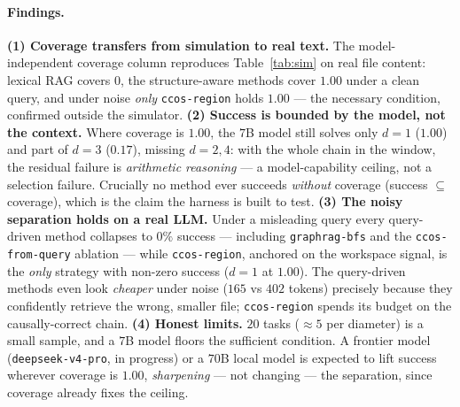 \documentclass[11pt]{article}
\newcommand{\code}[1]{\texttt{#1}}
\begin{document}
\paragraph{Findings.}
\textbf{(1) Coverage transfers from simulation to real text.} The
model-independent coverage column reproduces Table~\ref{tab:sim} on real file
content: lexical RAG covers $0$, the structure-aware methods cover $1.00$ under a
clean query, and under noise \emph{only} \code{ccos-region} holds $1.00$ --- the
necessary condition, confirmed outside the simulator.
\textbf{(2) Success is bounded by the model, not the context.} Where coverage is
$1.00$, the $7$B model still solves only $d{=}1$ ($1.00$) and part of $d{=}3$
($0.17$), missing $d{=}2,4$: with the whole chain in the window, the residual
failure is \emph{arithmetic reasoning} --- a model-capability ceiling, not a
selection failure. Crucially no method ever succeeds \emph{without} coverage
(success $\subseteq$ coverage), which is the claim the harness is built to test.
\textbf{(3) The noisy separation holds on a real LLM.} Under a misleading query
every query-driven method collapses to $0\%$ success --- including
\code{graphrag-bfs} and the \code{ccos-from-query} ablation --- while
\code{ccos-region}, anchored on the workspace signal, is the \emph{only} strategy
with non-zero success ($d{=}1$ at $1.00$). The query-driven methods even look
\emph{cheaper} under noise ($165$ vs $402$ tokens) precisely because they
confidently retrieve the wrong, smaller file; \code{ccos-region} spends its budget
on the causally-correct chain.
\textbf{(4) Honest limits.} $20$ tasks ($\approx 5$ per diameter) is a small
sample, and a $7$B model floors the sufficient condition. A frontier model
(\code{deepseek-v4-pro}, in progress) or a $70$B local model is expected to lift
success wherever coverage is $1.00$, \emph{sharpening} --- not changing --- the
separation, since coverage already fixes the ceiling.
\end{document}
